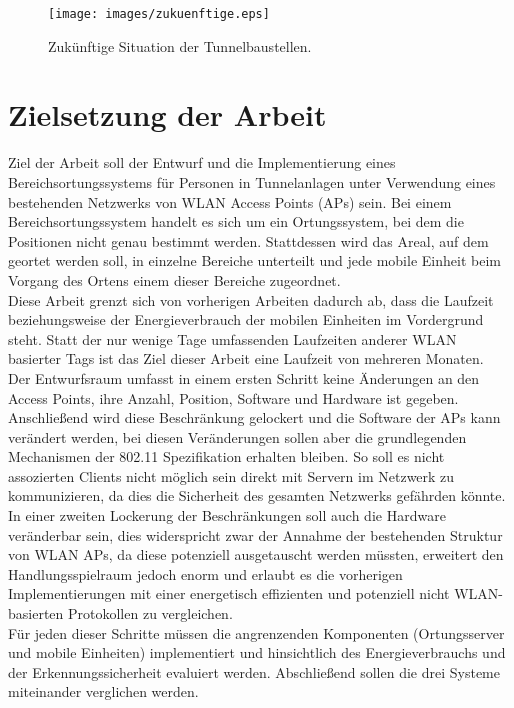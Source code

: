 \begin{figure}[h]
  \centering
	\texttt{[image: images/zukuenftige.eps]}
  \caption{Zukünftige Situation der Tunnelbaustellen.}
  \label{fig:zukuenftige}
\end{figure}

\section{Zielsetzung der Arbeit}
\label{ch:Einleitung:sec:Zielsetzung}
Ziel der Arbeit soll der Entwurf und die Implementierung eines Bereichsortungssystems für Personen in Tunnelanlagen unter Verwendung eines bestehenden Netzwerks von WLAN Access Points (APs) sein. 
Bei einem Bereichsortungssystem handelt es sich um ein Ortungssystem, bei dem die Positionen nicht genau bestimmt werden. 
Stattdessen wird das Areal, auf dem geortet werden soll, in einzelne Bereiche unterteilt und jede mobile Einheit beim Vorgang des Ortens einem dieser Bereiche zugeordnet.\\
Diese Arbeit grenzt sich von vorherigen Arbeiten dadurch ab, dass die Laufzeit beziehungsweise der Energieverbrauch der mobilen Einheiten im Vordergrund steht. 
Statt der nur wenige Tage umfassenden Laufzeiten anderer WLAN basierter Tags ist das Ziel dieser Arbeit eine Laufzeit von mehreren Monaten. \\
Der Entwurfsraum umfasst in einem ersten Schritt keine Änderungen an den Access Points, ihre Anzahl, Position, Software und Hardware ist gegeben. \\ %
Anschließend wird diese Beschränkung gelockert und die Software der APs kann verändert werden, bei diesen Veränderungen sollen aber die grundlegenden Mechanismen der 802.11 Spezifikation erhalten bleiben. 
So soll es nicht assozierten Clients nicht möglich sein direkt mit Servern im Netzwerk zu kommunizieren, da dies die Sicherheit des gesamten Netzwerks gefährden könnte.\\
In einer zweiten Lockerung der Beschränkungen soll auch die Hardware veränderbar sein, dies widerspricht zwar der Annahme der bestehenden Struktur von WLAN APs, da diese potenziell ausgetauscht werden müssten, erweitert den Handlungsspielraum jedoch enorm und erlaubt es die vorherigen Implementierungen mit einer energetisch effizienten und potenziell nicht WLAN-basierten Protokollen zu vergleichen. \\
Für jeden dieser Schritte müssen die angrenzenden Komponenten (Ortungsserver und mobile Einheiten) implementiert und hinsichtlich des Energieverbrauchs und der Erkennungssicherheit evaluiert werden. Abschließend sollen die drei Systeme miteinander verglichen werden. \\


